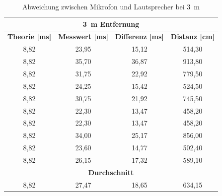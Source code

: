 \begin{table}[H]
\centering
\caption{Abweichung zwischen Mikrofon und Lautsprecher bei \SI{3}{m}}
\label{tab:modul_D_3}
\begin{tabular}{|c|c|c|c|}
\hline
\multicolumn{4}{|c|}{\textbf{\SI{3}{\m} Entfernung}}                                                                                                              \\ \hline
\textbf{Theorie [\si{ms}]} & \textbf{Messwert [\si{ms}]} & \multicolumn{1}{l|}{\textbf{Differenz [\si{ms}]}} & \multicolumn{1}{l|}{\textbf{Distanz [\si{cm}]}} \\ \hline
8,82                      & 23,95                      & 15,12                                            & 514,30                                         \\ \hline
8,82                      & 35,70                      & 36,87                                            & 913,80                                         \\ \hline
8,82                      & 31,75                      & 22,92                                            & 779,50                                         \\ \hline
8,82                      & 24,25                      & 15,42                                            & 524,50                                         \\ \hline
8,82                      & 30,75                      & 21,92                                            & 745,50                                         \\ \hline
8,82                      & 22,30                      & 13,47                                            & 458,20                                         \\ \hline
8,82                      & 22,30                      & 13,47                                            & 458,20                                         \\ \hline
8,82                      & 34,00                      & 25,17                                            & 856,00                                         \\ \hline
8,82                      & 23,60                      & 14,77                                            & 502,40                                         \\ \hline
8,82                      & 26,15                      & 17,32                                            & 589,10                                         \\ \hline
\multicolumn{4}{|c|}{\textbf{Durchschnitt}}                                                                                                                \\ \hline
8,82                      & 27,47                      & 18,65                                            & 634,15                                         \\ \hline
\end{tabular}
\end{table}

